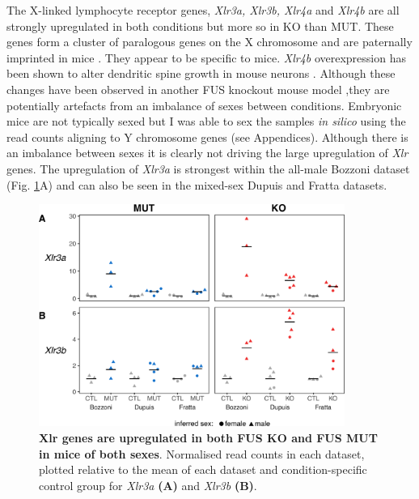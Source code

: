 The X-linked lymphocyte receptor genes, \textit{Xlr3a, Xlr3b, Xlr4a} and \textit{Xlr4b} are all strongly upregulated in both conditions but more so in KO than MUT. 
These genes form a cluster of paralogous genes on the X chromosome and are paternally imprinted in mice \citep{Raefski2005}.
They appear to be specific to mice.
\textit{Xlr4b} overexpression has been shown to alter dendritic spine growth in mouse neurons \citep{Cubelos2010}. 
Although these changes have been observed in another FUS knockout mouse model \citep{Kino2015},they are potentially artefacts from an imbalance of sexes between conditions. 
Embryonic mice are not typically sexed but I was able to sex the samples \textit{in silico} using the read counts aligning to Y chromosome genes (see Appendices). 
Although there is an imbalance between sexes it is clearly not driving the large upregulation of \textit{Xlr} genes. 
The upregulation of \textit{Xlr3a} is strongest within the all-male Bozzoni dataset (Fig. \ref{fig:fus_xlr_expression}A) and can also be seen in the mixed-sex Dupuis and Fratta datasets. 

\begin{figure}[ht!]
	\centering
	\includegraphics[width=10cm]{Figures/06_fus_meta/xlr_sex_expression.png}
	\caption[Xlr genes are upregulated in both FUS KO and FUS MUT in mice of both sexes]{
		\textbf{Xlr genes are upregulated in both FUS KO and FUS MUT in mice of both sexes}.
    	Normalised read counts in each dataset, plotted relative to the mean of each dataset and condition-specific control group for \textit{Xlr3a} \textbf{(A)} and \textit{Xlr3b} \textbf{(B)}. 
	}
	\label{fig:fus_xlr_expression}
\end{figure}





